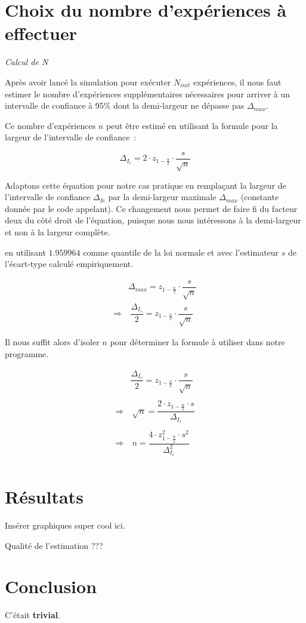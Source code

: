 \documentclass[paper=a4, fontsize=11pt]{scrartcl}
\begin{document}
\section{Choix du nombre d'expériences à effectuer}
\textit{Calcul de N}

Après avoir lancé la simulation pour exécuter $N_{init}$ expériences, il nous faut estimer le nombre d'expériences supplémentaires nécessaires pour arriver à un intervalle de confiance à 95\% dont la demi-largeur ne dépasse pas $\Delta_{max}$.

Ce nombre d'expériences $n$ peut être estimé en utilisant la formule pour la largeur de l'intervalle de confiance~:

\begin{equation*}
  \Delta_{I_c} = 2\cdot z_{1-\frac{\alpha}{2}}\cdot \dfrac{s}{\sqrt{n}}
\end{equation*}

Adaptons cette équation pour notre cas pratique en remplaçant la largeur de l'intervalle de confiance $\Delta_{Ic}$ par la demi-largeur maximale $\Delta_{max}$ (constante donnée par le code appelant). Ce changement nous permet de faire fi du facteur deux du côté droit de l'équation, puisque nous nous intéressons à la demi-largeur et non à la largeur complète.

en utilisant $1.959964$ comme quantile de la loi normale et avec l'estimateur $s$ de l'écart-type calculé empiriquement.

\begin{align*}
  &\Delta_{max} = z_{1-\frac{\alpha}{2}}\cdot \dfrac{s}{\sqrt{n}} \\
  \Rightarrow &\ \dfrac{\Delta_{I_c}}{2} = z_{1-\frac{\alpha}{2}}\cdot \dfrac{s}{\sqrt{n}}
\end{align*}

Il nous suffit alors d'isoler $n$ pour déterminer la formule à utiliser dans notre programme.

\begin{align*}
  &\dfrac{\Delta_{I_c}}{2} = z_{1-\frac{\alpha}{2}}\cdot \dfrac{s}{\sqrt{n}} \\ \\
  \Rightarrow &\ \sqrt{n} = \dfrac{2\cdot z_{1-\frac{\alpha}{2}}\cdot s}{\Delta_{I_c}} \\ \\
  \Rightarrow &\ n = \dfrac{4\cdot z_{1-\frac{\alpha}{2}}^2\cdot s^2}{\Delta_{I_c}^2} \\
\end{align*}

\section{Résultats}
Insérer graphiques super cool ici.

Qualité de l'estimation ???

\section{Conclusion}
C'était \textbf{trivial}.
\end{document}

